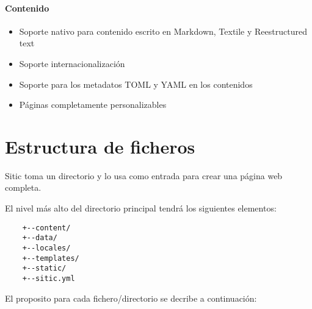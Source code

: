 \paragraph{Contenido}

\begin{itemize}
\item Soporte nativo para contenido escrito en Markdown, Textile y Reestructured text
\item Soporte internacionalización
\item Soporte para los metadatos TOML y YAML en los contenidos
\item Páginas completamente personalizables
\end{itemize}


\section{Estructura de ficheros}

Sitic toma un directorio y lo usa como entrada para crear una página web completa.

El nivel más alto del directorio principal tendrá los siguientes elementos:

\begin{verbatim}
    +--content/
    +--data/
    +--locales/
    +--templates/
    +--static/
    +--sitic.yml
\end{verbatim}

El proposito para cada fichero/directorio se decribe a continuación:

